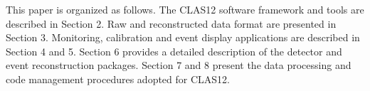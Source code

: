 This paper is organized as follows. The CLAS12 software framework and tools are described in Section 2. Raw and reconstructed data format are presented in Section 3. Monitoring, calibration and event display applications are described in Section 4 and 5. Section 6 provides a detailed description of the detector and event reconstruction packages. Section 7 and 8 present the data processing and code management procedures adopted for CLAS12.


